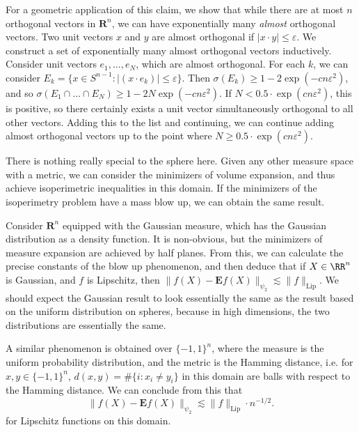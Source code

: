 \begin{example}
    For a geometric application of this claim, we show that while there are at most $n$ orthogonal vectors in $\mathbf{R}^n$, we can have exponentially many \emph{almost} orthogonal vectors. Two unit vectors $x$ and $y$ are almost orthogonal if $|x \cdot y| \leq \varepsilon$. We construct a set of exponentially many almost orthogonal vectors inductively. Consider unit vectors $e_1, \dots, e_N$, which are almost orthogonal. For each $k$, we can consider $E_k = \{ x \in S^{n-1} : |(x \cdot e_k)| \leq \varepsilon \}$. Then $\sigma(E_k) \geq 1 - 2\exp(-cn\varepsilon^2)$, and so $\sigma(E_1 \cap \dots \cap E_N) \geq 1 - 2N \exp(-cn \varepsilon^2)$. If $N < 0.5 \cdot \exp(cn\varepsilon^2)$, this is positive, so there certainly exists a unit vector simultaneously orthogonal to all other vectors. Adding this to the list and continuing, we can continue adding almost orthogonal vectors up to the point where $N \geq 0.5 \cdot \exp(cn \varepsilon^2)$.
\end{example}

There is nothing really special to the sphere here. Given any other measure space with a metric, we can consider the minimizers of volume expansion, and thus achieve isoperimetric inequalities in this domain. If the minimizers of the isoperimetry problem have a mass blow up, we can obtain the same result.

\begin{example}
    Consider $\mathbf{R}^n$ equipped with the Gaussian measure, which has the Gaussian distribution as a density function. It is non-obvious, but the minimizers of measure expansion are achieved by half planes. From this, we can calculate the precise constants of the blow up phenomenon, and then deduce that if $X \in \RR^n$ is Gaussian, and $f$ is Lipschitz, then $\| f(X) - \mathbf{E} f(X) \|_{\psi_2} \lesssim \| f \|_{\text{Lip}}$. We should expect the Gaussian result to look essentially the same as the result based on the uniform distribution on spheres, because in high dimensions, the two distributions are essentially the same.
\end{example}

\begin{example}
    A similar phenomenon is obtained over $\{ -1, 1 \}^n$, where the measure is the uniform probability distribution, and the metric is the Hamming distance, i.e. for $x,y \in \{ -1, 1 \}^n$, $d(x,y) = \# \{ i: x_i \neq y_i \}$ in this domain are balls with respect to the Hamming distance. We can conclude from this that
    \[ \| f(X) - \mathbf{E} f(X) \|_{\psi_2} \lesssim \| f \|_{\text{Lip}} \cdot n^{-1/2}. \]
    for Lipschitz functions on this domain.
\end{example}

